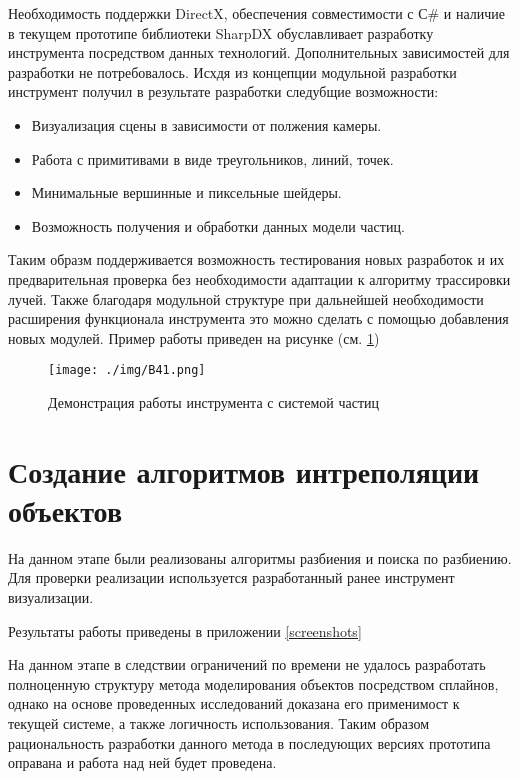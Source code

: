 Необходимость поддержки DirectX, обеспечения совместимости с  С\# и наличие в текущем прототипе библиотеки SharpDX обуславливает разработку инструмента посредством данных технологий. Дополнительных зависимостей для разработки не потребовалось. Исхдя из концепции модульной разработки инструмент получил в результате разработки следубщие возможности:

\begin{itemize}
	\item Визуализация сцены в зависимости от полжения камеры.
	\item Работа с примитивами в виде треугольников,  линий, точек.
	\item Минимальные вершинные и пиксельные шейдеры.
	\item Возможность получения и обработки данных модели частиц.
\end{itemize}

Таким образм поддерживается возможность тестирования новых разработок и их предварительная проверка без необходимости адаптации к алгоритму трассировки лучей. Также благодаря модульной структуре при дальнейшей необходимости расширения функционала инструмента это можно сделать с помощью добавления новых модулей. Пример работы приведен на рисунке (см. \ref{pic:B41})

\begin{figure} 
\begin{center}
\texttt{[image: ./img/B41.png]}
\end{center}
\caption{Демонстрация работы инструмента с системой частиц}
\label{pic:B41}
\end{figure}

\section{Создание алгоритмов интреполяции объектов}

На данном этапе были реализованы алгоритмы разбиения и поиска по разбиению. Для проверки реализации используется разработанный ранее инструмент визуализации.

Результаты работы приведены в приложении \ref{screenshots}

На данном этапе в следствии ограничений по времени не удалось разработать полноценную структуру метода моделирования объектов посредством сплайнов, однако на основе проведенных исследований доказана его применимост к текущей системе, а также логичность использования. Таким образом рациональность разработки данного метода в последующих версиях прототипа оправана и работа над ней будет проведена.

